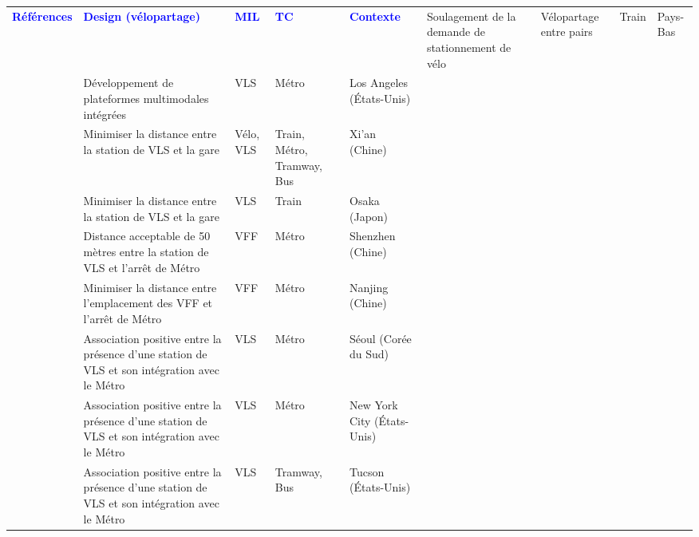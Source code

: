         \begin{longtable}{p{3cm}p{4cm}p{1.5cm}p{1.8cm}p{2.3cm}}
        \hline
        \textcolor{blue}{\textbf{Références}} & \textcolor{blue}{\textbf{Design (vélopartage)}} & \textcolor{blue}{\textbf{MIL}} & \textcolor{blue}{\textbf{TC}} & \textcolor{blue}{\textbf{Contexte}}
        \hline
        \endhead
    \small{\textcite{van_goeverden_potential_2018}} & \small{Soulagement de la demande de stationnement de vélo} & \small{Vélopartage entre pairs} & \small{Train} & \small{Pays-Bas}\\
    \small{\textcite{nam_designing_2018}} & \small{Développement de plateformes multimodales intégrées} & \small{VLS} & \small{Métro} & \small{Los Angeles (États-Unis)}\\
    \small{\textcite{yang_bike-and-ride_2014}} & \small{Minimiser la distance entre la station de VLS et la gare} & \small{Vélo, VLS} & \small{Train, Métro, Tramway, Bus} & \small{Xi'an (Chine)}\\
    \small{\textcite{tomita_demand_2017}} & \small{Minimiser la distance entre la station de VLS et la gare} & \small{VLS} & \small{Train} & \small{Osaka (Japon)}\\
    \small{\textcite{wu_identification_2023}} & \small{Distance acceptable de 50 mètres entre la station de VLS et l'arrêt de Métro} & \small{VFF} & \small{Métro} & \small{Shenzhen (Chine)}\\
    \small{\textcite{cheng_exploring_2022}} & \small{Minimiser la distance entre l'emplacement des VFF et l'arrêt de Métro} & \small{VFF} & \small{Métro} & \small{Nanjing (Chine)}\\
    \small{\textcite{cho_estimation_2022}} & \small{Association positive entre la présence d'une station de VLS et son intégration avec le Métro} & \small{VLS} & \small{Métro} & \small{Séoul (Corée du Sud)}\\
    \small{\textcite{ashraf_impacts_2021}} & \small{Association positive entre la présence d'une station de VLS et son intégration avec le Métro} & \small{VLS} & \small{Métro} & \small{New York City (États-Unis)}\\
    \small{\textcite{li_investigating_2022}} & \small{Association positive entre la présence d'une station de VLS et son intégration avec le Métro} & \small{VLS} & \small{Tramway, Bus} & \small{Tucson (États-Unis)}\\

\end{longtable}
